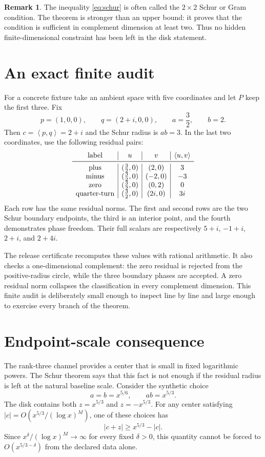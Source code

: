 \documentclass[11pt]{article}
\theoremstyle{definition}
\newtheorem{remark}{Remark}
\newcommand{\ip}[2]{\left\langle #1,#2\right\rangle}
\begin{document}
\begin{remark}
The inequality \eqref{eq:schur} is often called the $2\times2$ Schur or Gram
condition.  The theorem is stronger than an upper bound: it proves that the
condition is sufficient in complement dimension at least two.  Thus no hidden
finite-dimensional constraint has been left in the disk statement.
\end{remark}

\section{An exact finite audit}

For a concrete fixture take an ambient space with five coordinates and let $P$
keep the first three.  Fix
\[
 p=(1,0,0),\qquad q=(2+i,0,0),\qquad a=\frac32,\qquad b=2.
\]
Then $c=\ip{p}{q}=2+i$ and the Schur radius is $ab=3$.  In the last two
coordinates, use the following residual pairs:
\[
\begin{array}{c|c|c|c}
 \text{label}&u&v&\ip{u}{v}\\ \midrule
 \text{plus}&(\frac32,0)&(2,0)&3\\
 \text{minus}&(\frac32,0)&(-2,0)&-3\\
 \text{zero}&(\frac32,0)&(0,2)&0\\
 \text{quarter-turn}&(\frac32,0)&(2i,0)&3i
\end{array}
\]
Each row has the same residual norms.  The first and second rows are the two
Schur boundary endpoints, the third is an interior point, and the fourth
demonstrates phase freedom.  Their full scalars are respectively
\(5+i\), \(-1+i\), \(2+i\), and \(2+4i\).

The release certificate recomputes these values with rational arithmetic.  It
also checks a one-dimensional complement: the zero residual is rejected from
the positive-radius circle, while the three boundary phases are accepted.  A
zero residual norm collapses the classification in every complement dimension.
This finite audit is deliberately small enough to inspect line by line and
large enough to exercise every branch of the theorem.

\section{Endpoint-scale consequence}

The rank-three channel provides a center that is small in fixed logarithmic
powers.  The Schur theorem says that this fact is not enough if the residual
radius is left at the natural baseline scale.  Consider the synthetic choice
\[
 a=b=x^{5/6},\qquad ab=x^{5/3}.
\]
The disk contains both $z=x^{5/3}$ and $z=-x^{5/3}$.  For any center satisfying
\(|c|=O(x^{5/3}/(\log x)^M)\), one of these choices has
\[
 |c+z|\geq x^{5/3}-|c|.
\]
Since $x^\delta/(\log x)^M\to\infty$ for every fixed $\delta>0$, this
quantity cannot be forced to $O(x^{5/3-\delta})$ from the declared data alone.
\end{document}
